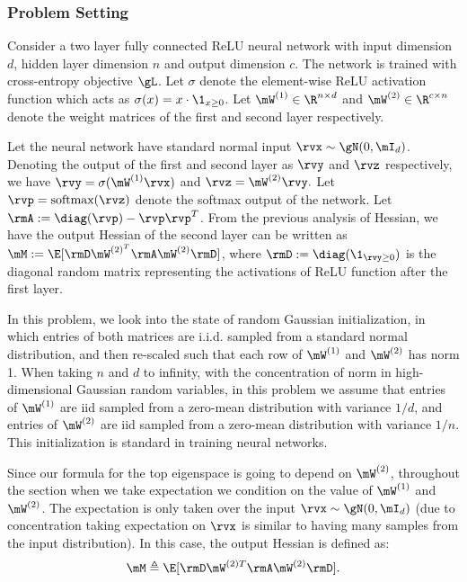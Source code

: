 \subsubsection{Problem Setting}

Consider a two layer fully connected ReLU neural network with input dimension $d$, hidden layer dimension $n$ and output dimension $c$. The network is trained with cross-entropy objective $\gL$. Let $\sigma$ denote the element-wise ReLU activation function which acts as $\sigma(x) = x\cdot\1_{x\geq 0}$.
Let $\mW^{(1)}\in\R^{n\times d}$ and $\mW^{(2)}\in\R^{c\times n}$ denote the weight matrices of the first and second layer respectively. 

Let the neural network have standard normal input $\rvx\sim \gN(0, \mI_d)$. 
Denoting the output of the first and second layer as $\rvy$ and $\rvz$ respectively, we have $\rvy = \sigma(\mW^{(1)}\rvx)$ and $\rvz = \mW^{(2)}\rvy.$ Let $\rvp=\mbox{softmax}(\rvz)$ denote the softmax output of the network. Let $\rmA:=\diag(\rvp)-\rvp\rvp^T$. From the previous analysis of Hessian, we have the output Hessian of the second layer can be written as $\mM := \E[\rmD\mW^{(2)^T}\rmA\mW^{(2)}\rmD]$, where $\rmD:=\diag(\1_{\rvy\geq 0})$ is the diagonal random matrix representing the activations of ReLU function after the first layer.

In this problem, we look into the state of random Gaussian initialization, in which entries of both matrices are i.i.d. sampled from a standard normal distribution, and then re-scaled such that each row of $\mW^{(1)}$ and $\mW^{(2)}$ has norm 1. When taking $n$ and $d$ to infinity, with the concentration of norm in high-dimensional Gaussian random variables, in this problem we assume that entries of $\mW^{(1)}$ are iid sampled from a zero-mean distribution with variance $1/d$, and entries of $\mW^{(2)}$ are iid sampled from a zero-mean distribution with variance $1/n$. This initialization is standard in training neural networks.

Since our formula for the top eigenspace is going to depend on $\mW^{(2)}$, throughout the section when we take expectation we condition on the value of $\mW^{(1)}$ and $\mW^{(2)}$. The expectation is only taken over the input $\rvx\sim \gN(0, \mI_d)$ (due to concentration taking expectation on $\rvx$ is similar to having many samples from the input distribution). In this case, the output Hessian is defined as:
\begin{equation}
\mM\triangleq\E[\rmD\mW^{(2)T}\rmA\mW^{(2)}\rmD].
\end{equation}

